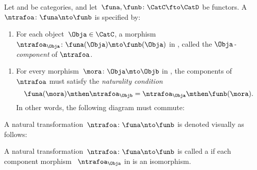 \begin{ctdefinition}
	\label{def:natural-transformation}
	Let \CatC and \CatD be categories, and let~$\funa,\funb\colon \CatC\fto \CatD$ be functors.
	A \emph{}~$\ntrafoa \colon \funa\nto \funb$ is specified by:

	\constit
	\begin{enumerate}
		\item For each object~$\Obja\in \CatC$, a morphism $\ntrafoa_\Obja \colon \funa(\Obja)\mto \funb(\Obja)$ in \CatD, called the $\Obja$\emph{-component} of $\ntrafoa$.
	\end{enumerate}
	\condit
	\begin{enumerate}
		\item For every morphism~$\mora\colon \Obja\mto \Objb$ in \CatC, the components of $\ntrafoa$ must satisfy the \emph{naturality condition}
		      \begin{equation}
			      \funa(\mora)\mthen \ntrafoa_\Objb = \ntrafoa_\Obja\mthen \funb(\mora).
		      \end{equation}
		      In other words, the following diagram must commute:
		      \begin{center}
		      \end{center}
	\end{enumerate}
	A natural transformation~$\ntrafoa \colon \funa\nto \funb$ is denoted visually as follows:
	\begin{center}
	\end{center}
\end{ctdefinition}

\begin{figure}[h!]
	\centering
	\caption{}
	\label{fig:nat_trans_graphically}
\end{figure}

\begin{ctdefinition}
	\label{def:nat_iso}
	A natural transformation~$\ntrafoa \colon \funa \nto \funb $ is called a \emph{} if each component morphism ~$\ntrafoa_\Obja$ in \CatD is an isomorphism.
\end{ctdefinition}


